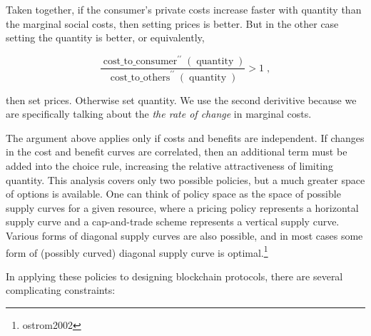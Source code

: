 \documentclass[12pt, final]{article}
\newcommand{\fname}[1]{ \operatorname{ #1 } }
\newcommand{\opname}[1]{ \operatorname{ #1 } }
\begin{document}
Taken together, if the consumer's private costs increase faster with quantity than the  marginal social costs, then setting prices is better.   But in the other case setting the quantity is better, or equivalently,


\begin{equation}
\frac{ \fname{cost\_to\_consumer}^{\prime \prime}( \opname{quantity} ) }{ \fname{cost\_to\_others}^{\prime \prime}( \opname{quantity}) }  > 1 \; ,
\end{equation}

then set prices.  Otherwise set quantity.  We use the second derivitive because we are specifically talking about the \emph{the rate of change} in marginal costs.   


The argument above applies only if costs and benefits are independent. If changes in the cost and benefit curves are correlated, then an additional term must be added into the choice rule, increasing the relative attractiveness of limiting quantity.  This analysis covers only two possible policies, but a much greater space of options is available.  One can think of policy space as the space of possible supply curves for a given resource, where a pricing policy represents a horizontal supply curve and a cap-and-trade scheme represents a vertical supply curve. Various forms of diagonal supply curves are also possible, and in most cases some form of (possibly curved) diagonal supply curve is optimal.\footnote{ostrom2002}

In applying these policies to designing blockchain protocols, there are several complicating constraints: 
\end{document}
